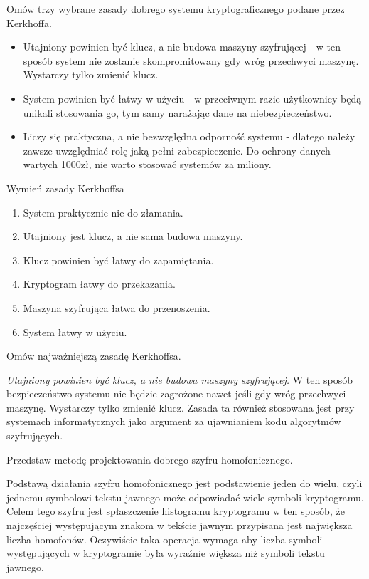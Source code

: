 \documentclass[answers,11pt]{exam}
\begin{document}
\begin{questions}

\question Omów trzy wybrane zasady dobrego systemu kryptograficznego podane przez Kerkhoffa.
\begin{solution}
\begin{itemize}
\item Utajniony powinien być klucz, a nie budowa maszyny szyfrującej - w ten sposób system nie zostanie skompromitowany gdy wróg przechwyci maszynę. Wystarczy tylko zmienić klucz.
\item System powinien być łatwy w użyciu - w przeciwnym razie użytkownicy będą unikali stosowania go, tym samy narażając dane na niebezpieczeństwo.
\item Liczy się praktyczna, a nie bezwzględna odporność systemu - dlatego należy zawsze uwzględniać rolę jaką pełni zabezpieczenie. Do ochrony danych wartych 1000zł, nie warto stosować systemów za miliony.
\end{itemize}
\end{solution}

\question Wymień zasady Kerkhoffsa
\begin{solution}
\begin{enumerate}
\item System praktycznie nie do złamania.
\item Utajniony jest klucz, a nie sama budowa maszyny. 
\item Klucz powinien być łatwy do zapamiętania.
\item Kryptogram łatwy do przekazania.
\item Maszyna szyfrująca łatwa do przenoszenia. 
\item System łatwy w użyciu.
\end{enumerate}
\end{solution}

\question Omów najważniejszą zasadę Kerkhoffsa.
\begin{solution}
\emph{Utajniony powinien być klucz, a nie budowa maszyny szyfrującej.} W ten sposób bezpieczeństwo systemu nie będzie zagrożone nawet jeśli gdy wróg przechwyci maszynę. Wystarczy tylko zmienić klucz. Zasada ta również stosowana jest przy systemach informatycznych jako argument za ujawnianiem kodu algorytmów szyfrujących.
\end{solution}

\question Przedstaw metodę projektowania dobrego szyfru homofonicznego.
\begin{solution}
Podstawą działania szyfru homofonicznego jest podstawienie jeden do wielu, czyli jednemu symbolowi tekstu jawnego może odpowiadać wiele symboli kryptogramu. Celem tego szyfru jest spłaszczenie histogramu kryptogramu w ten sposób, że najczęściej występującym znakom w tekście jawnym przypisana jest największa liczba homofonów. Oczywiście taka operacja wymaga aby liczba symboli występujących w kryptogramie była wyraźnie większa niż symboli tekstu jawnego.
\end{solution}


\end{questions}
\end{document}
